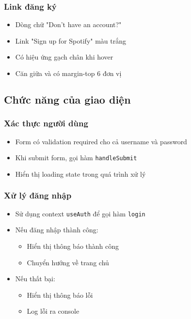 \subsubsection{Link đăng ký}
\begin{itemize}
    \item Dòng chữ "Don't have an account?"
    \item Link "Sign up for Spotify" màu trắng
    \item Có hiệu ứng gạch chân khi hover
    \item Căn giữa và có margin-top 6 đơn vị
\end{itemize}

\subsection{Chức năng của giao diện}

\subsubsection{Xác thực người dùng}
\begin{itemize}
    \item Form có validation required cho cả username và password
    \item Khi submit form, gọi hàm \texttt{handleSubmit}
    \item Hiển thị loading state trong quá trình xử lý
\end{itemize}

\subsubsection{Xử lý đăng nhập}
\begin{itemize}
    \item Sử dụng context \texttt{useAuth} để gọi hàm \texttt{login}
    \item Nếu đăng nhập thành công:
    \begin{itemize}
        \item Hiển thị thông báo thành công
        \item Chuyển hướng về trang chủ
    \end{itemize}
    \item Nếu thất bại:
    \begin{itemize}
        \item Hiển thị thông báo lỗi
        \item Log lỗi ra console
    \end{itemize}
\end{itemize}

